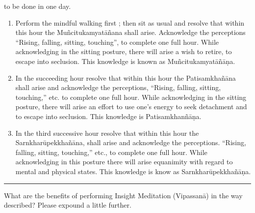 \documentclass[a5paper,10pt,english]{book}
\begin{document}
\sphinxAtStartPar
{} to be done in one day.
\begin{enumerate}
%
\item {} 
\sphinxAtStartPar
Perform the mindful walking first ; then sit as usual and resolve that within this hour the Muñcitukamyatāñana shall arise. Acknowledge the perceptions “Rising, falling, sitting, touching”, to complete one full hour. While acknowledging in the sitting posture, there will arise a wish to retire, to escape into seclusion. This knowledge is known as Muñcitukamyatāñāṇa.

\item {} 
\sphinxAtStartPar
In the succeeding hour resolve that within this hour the Patisamkhañāna shall arise and acknowledge the perceptions, “Rising, falling, sitting, touching,” etc. to complete one full hour. While acknowledging in the sitting posture, there will arise an effort to use one’s energy to seek detachment and to escape into seclusion. This knowledge is Patisamkhanñāṇa.

\item {} 
\sphinxAtStartPar
In the third successive hour resolve that within this hour the Sarnkharūpekkhañāna, shall arise and acknowledge the perceptions. “Rising, falling, sitting, touching,” etc., to complete one full hour. While acknowledging in this posture there will arise equanimity with regard to mental and physical states. This knowledge is know as Sarnkharūpekkhañāṇa.

\end{enumerate}


\bigskip\hrule\bigskip


\sphinxAtStartPar
{} What are the benefits of performing Insight Meditation (Vipassanā) in the way described? Please expound a little further.
\end{document}
